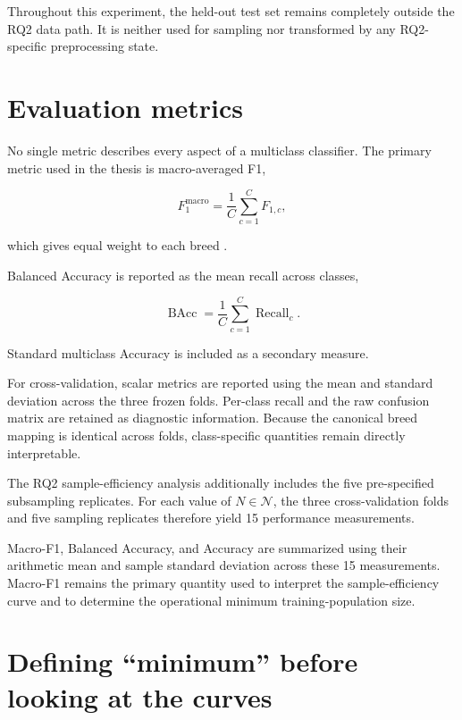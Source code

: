 Throughout this experiment, the held-out test set remains completely
outside the RQ2 data path. It is neither used for sampling nor
transformed by any RQ2-specific preprocessing state.

\section{Evaluation metrics}
\label{sec:evaluation_metrics}

No single metric describes every aspect of a multiclass classifier.
The primary metric used in the thesis is macro-averaged F1,

\begin{equation}
    F_{1}^{\mathrm{macro}}
    =
    \frac{1}{C}
    \sum_{c=1}^{C}
    F_{1,c},
    \label{eq:macro_f1}
\end{equation}

which gives equal weight to each breed \cite{sokolova2009systematic}.

Balanced Accuracy is reported as the mean recall across classes,

\begin{equation}
    \operatorname{BAcc}
    =
    \frac{1}{C}
    \sum_{c=1}^{C}
    \operatorname{Recall}_c.
\end{equation}

Standard multiclass Accuracy is included as a secondary measure.

For cross-validation, scalar metrics are reported using the mean and
standard deviation across the three frozen folds. Per-class recall and
the raw confusion matrix are retained as diagnostic information.
Because the canonical breed mapping is identical across folds,
class-specific quantities remain directly interpretable.

The RQ2 sample-efficiency analysis additionally includes the five
pre-specified subsampling replicates. For each value of
$N\in\mathcal{N}$, the three cross-validation folds and five sampling
replicates therefore yield 15 performance measurements.

Macro-F1, Balanced Accuracy, and Accuracy are summarized using their
arithmetic mean and sample standard deviation across these 15
measurements. Macro-F1 remains the primary quantity used to interpret
the sample-efficiency curve and to determine the operational minimum
training-population size.

\section{Defining ``minimum'' before looking at the curves}
\label{sec:minimum_requirements}

